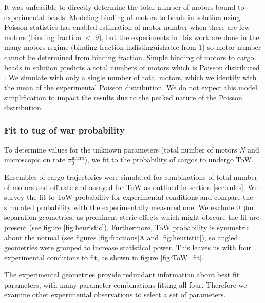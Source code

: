It was unfeasible to directly determine the total number of motors bound to experimental beads. Modeling binding of motors to beads in solution using Poisson statistics has enabled estimation of motor number when there are few motors (binding fraction $< .9$)\cite{Li2016}, but the experiments in this work are done in the many motors regime (binding fraction indistinguishable from 1) so motor number cannot be determined from binding fraction. Simple binding of motors to cargo beads in solution predicts a total numbers of motors which is Poisson distributed \cite{Svoboda1994}. We simulate with only a single number of total motors, which we identify with the mean of the experimental Poisson distribution. We do not expect this model simplification to impact the results due to the peaked nature of the Poisson distribution.

\subsubsection*{Fit to tug of war probability}

To determine values for the unknown parameters (total number of motors $N$ and microscopic on rate $\pi_0^{\text{micro}}$), we fit to the probability of cargos to undergo ToW.

Ensembles of cargo trajectories were simulated for combinations of total number of motors and off rate and assayed for ToW as outlined in section \ref{sec:rules}. We survey the fit to ToW probability for experimental conditions and compare the simulated probability with the experimentally measured one. We exclude \SI{0}{\micro\meter} separation geometries, as prominent steric effects which might obscure the fit are present (see figure \ref{fig:heuristic}). Furthermore, ToW probability is symmetric about the normal (see figures \ref{fig:fractions}A and \ref{fig:heuristic}), so angled geometries were grouped to increase statistical power. This leaves us with four experimental conditions to fit, as shown in figure \ref{fig:ToW_fit}.

The experimental geometries provide redundant information about best fit parameters, with many parameter combinations fitting all four. Therefore we examine other experimental observations to select a set of parameters.

